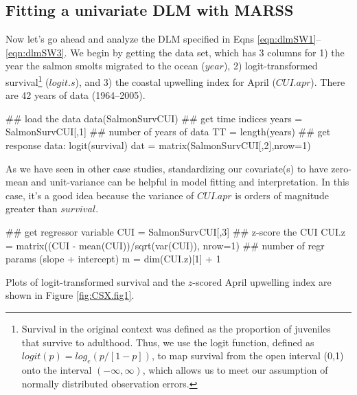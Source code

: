 \documentclass[10pt]{article}
\begin{document}
\subsection{Fitting a univariate DLM with MARSS}
Now let's go ahead and analyze the DLM specified in Eqns \ref{eqn:dlmSW1}--\ref{eqn:dlmSW3}. We begin by getting the data set, which has 3 columns for 1) the year the salmon smolts migrated to the ocean ($year$), 2) logit-transformed survival\footnote{Survival in the original context was defined as the proportion of juveniles that survive to adulthood. Thus, we use the logit function, defined as $logit(p)=log_e(p/[1-p])$, to map survival from the open interval (0,1) onto the interval $(-\infty,\infty)$, which allows us to meet our assumption of normally distributed observation errors.} ($logit.s$), and 3) the coastal upwelling index for April ($CUI.apr$). There are 42 years of data (1964--2005).
\begin{Schunk}
\begin{Sinput}
 ## load the data
 data(SalmonSurvCUI)
 ## get time indices
 years = SalmonSurvCUI[,1]
 ## number of years of data
 TT = length(years)
 ## get response data: logit(survival)
 dat = matrix(SalmonSurvCUI[,2],nrow=1)
\end{Sinput}
\end{Schunk}

As we have seen in other case studies, standardizing our covariate(s) to have zero-mean and unit-variance can be helpful in model fitting and interpretation. In this case, it's a good idea because the variance of $CUI.apr$ is orders of magnitude greater than $survival$.
\begin{Schunk}
\begin{Sinput}
 ## get regressor variable
 CUI = SalmonSurvCUI[,3]
 ## z-score the CUI
 CUI.z = matrix((CUI - mean(CUI))/sqrt(var(CUI)), nrow=1)
 ## number of regr params (slope + intercept)
 m = dim(CUI.z)[1] + 1
\end{Sinput}
\end{Schunk}
Plots of logit-transformed survival and the $z$-scored April upwelling index are shown in Figure \ref{fig:CSX.fig1}.
\end{document}
